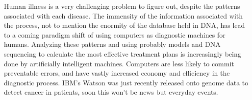 \documentclass[11pt]{article}
\newcommand{\tab}{\hspace*{2em}}
\begin{document}
\begin{doublespace}
\tab Human illness is a very challenging problem to figure out, despite the patterns associated with each disease. The
immensity of the information associated with the process, not to mention the enormity of the database held in DNA, has 
lead to a coming paradigm shift of using computers as diagnostic machines for humans. Analyzing these patterns and using
probably models and DNA sequencing to calculate the most effective treatment plans is increasingly being done by 
artificially intelligent machines. Computers are less likely to commit preventable errors, and have vastly increased 
economy and efficiency in the diagnostic process. IBM's Watson was just recently released onto genome data to detect 
cancer in patients, soon this won't be news but everyday events. 

\pagebreak


\end{doublespace}

\nocite{*}



\end{document}
